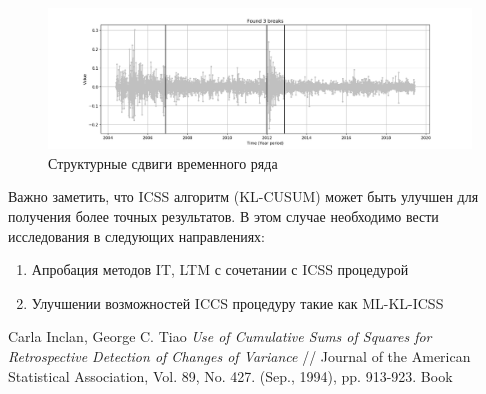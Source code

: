 \documentclass[a4paper,14pt,russian]{extarticle}
\begin{document}
	\begin{figure}[H]
		\includegraphics[width=\linewidth]{ru_stock_simulation_LKOH.png}
		\caption{\label{fig:fig3} Структурные сдвиги временного ряда}
	\end{figure}
	Важно заметить, что ICSS алгоритм (KL-CUSUM) может быть улучшен для получения более точных результатов. В этом случае необходимо вести исследования в следующих направлениях:
	\begin{enumerate}
		\item Апробация методов IT, LTM с сочетании с ICSS процедурой
		\item Улучшении возможностей ICCS процедуру такие как ML-KL-ICSS
	\end{enumerate}
	\clearpage
	\begin{thebibliography}{20}
		\label{sec:sec4}
		 Carla Inclan, George C. Tiao \emph{Use of Cumulative Sums of Squares for Retrospective Detection of Changes of
			Variance} // Journal of the American Statistical Association, Vol. 89, No. 427. (Sep., 1994), pp. 913-923.
		 Book
	\end{thebibliography}
\end{document}
